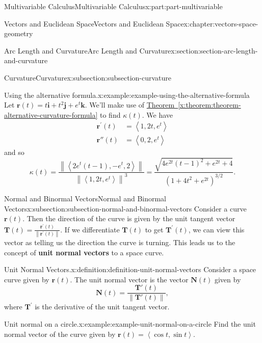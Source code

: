 \documentclass[twoside,10pt,]{tufte-book}
\newcommand{\xreffont}{\relax}
\newcommand{\terminology}[1]{\textbf{#1}}
\numberwithin{equation}{part}
\newcommand{\norm}[1]{\left\| #1 \right\|}
\newcommand{\dotprod}[1]{\left\langle #1 \right\rangle}
\begin{document}
\begin{partptx}{Multivariable Calculus}{}{Multivariable Calculus}{}{}{x:part:part-multivariable}
\begin{chapterptx}{Vectors and Euclidean Space}{}{Vectors and Euclidean Space}{}{}{x:chapter:vectors-space-geometry}
\begin{sectionptx}{Arc Length and Curvature}{}{Arc Length and Curvature}{}{}{x:section:section-arc-length-and-curvature}
\begin{subsectionptx}{Curvature}{}{Curvature}{}{}{x:subsection:subsection-curvature}
\begin{example}{Using the alternative formula.}{x:example:example-using-the-alternative-formula}
Let \(\mathbf{r}(t) = t\mathbf{i}+t^{2}\mathbf{j}+e^{t}\mathbf{k}\). We'll make use of \hyperref[x:theorem:theorem-alternative-curvature-formula]{Theorem~{\xreffont\ref{x:theorem:theorem-alternative-curvature-formula}}} to find \(\kappa(t).\) We have%
%
\begin{align*}
\mathbf{r}^\prime(t) & = \dotprod{1,2t,e^{t}} \\
\mathbf{r}''(t) & = \dotprod{0,2,e^{t}} 
\end{align*}
and so%
%
\begin{equation*}
\kappa(t) = \frac{\norm{\dotprod{2e^{t}(t-1),-e^{t},2}}}{\norm{\dotprod{1,2t,e^{t}}}^{3}} = \frac{\sqrt{4e^{2t}(t-1)^{2}+e^{2t}+4}}{(1+4t^{2}+e^{2t})^{3/2}}.
\end{equation*}
\end{example}
\end{subsectionptx}
%
%
\typeout{************************************************}
\typeout{************************************************}
%
\begin{subsectionptx}{Normal and Binormal Vectors}{}{Normal and Binormal Vectors}{}{}{x:subsection:subsection-normal-and-binormal-vectors}
Consider a curve \(\mathbf{r}(t)\). Then the direction of the curve is given by the unit tangent vector \(\mathbf{T}(t) = \frac{\mathbf{r}^\prime(t)}{\norm{\mathbf{r}^\prime(t)}}\). If we differentiate \(\mathbf{T}(t)\) to get \(\mathbf{T}^{\prime}(t)\), we can view this vector as telling us the direction the curve is turning. This leads us to the concept of \terminology{unit normal vectors} to a space curve.%
\begin{definition}{Unit Normal Vectors.}{x:definition:definition-unit-normal-vectors}%
%
Consider a space curve given by \(\mathbf{r}(t)\). The unit normal vector is the vector \(\mathbf{N}(t)\) given by%
%
\begin{equation*}
\mathbf{N}(t) = \frac{\mathbf{T}'(t)}{\norm{\mathbf{T}'(t)}},
\end{equation*}
where \(\mathbf{T}^{\prime}\) is the derivative of the unit tangent vector.%
\end{definition}
\begin{example}{Unit normal on a circle.}{x:example:example-unit-normal-on-a-circle}%
Find the unit normal vector of the curve given by \(\mathbf{r}(t) = \dotprod{\cos t,\sin t}\).%
\par\smallskip%

\end{example}
\end{subsectionptx}
\end{sectionptx}
\end{chapterptx}
\end{partptx}
\end{document}
